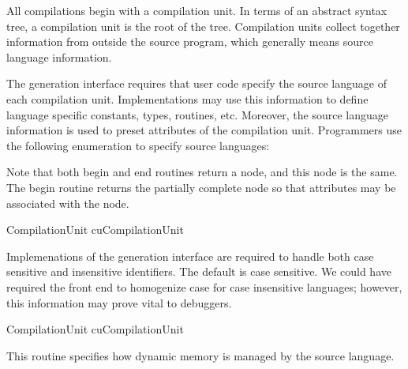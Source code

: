 
\label{sec:compilationUnit}

All compilations begin with a compilation unit.  In terms of an
abstract syntax tree, a compilation unit is the root of the tree.  
Compilation units collect together information from outside the source
program, which generally means source language information.

The generation interface requires that user code specify the source
language of each compilation unit.  Implementations may use this
information to define language specific constants, types, routines,
etc.  Moreover, the source language information is used to preset
attributes of the compilation unit.  Programmers use the following
enumeration to specify source languages:

\begin{center}
\end{center}

\begin{functionality}
  Note that both begin and end
routines return a  node, and this node is the
same.  The begin routine returns the partially complete node so that
attributes may be associated with the node.
\end{functionality}


	{CompilationUnit cu}{CompilationUnit}
\begin{functionality}
Implemenations of the generation interface are required to handle
both case sensitive and insensitive identifiers.  The default is case
sensitive.  We could have required the front end to homogenize case
for case insensitive languages; however, this information may prove
vital to debuggers.
\end{functionality}

	{CompilationUnit cu}{CompilationUnit}
\begin{functionality}
This routine specifies how dynamic memory is managed by the source language.
\end{functionality}

